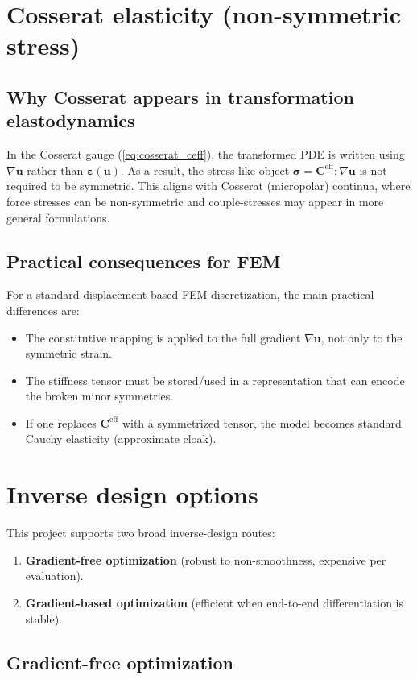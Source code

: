 \documentclass[11pt,a4paper]{report}
\begin{document}
\chapter{Cosserat elasticity (non-symmetric stress)}
\section{Why Cosserat appears in transformation elastodynamics}
In the Cosserat gauge (\cref{eq:cosserat_ceff}), the transformed PDE is written using $\nabla \bm u$ rather than $\bm\varepsilon(\bm u)$.
As a result, the stress-like object $\bm\sigma = \bm C^{\mathrm{eff}} : \nabla \bm u$ is not required to be symmetric.
This aligns with Cosserat (micropolar) continua, where force stresses can be non-symmetric and couple-stresses may appear in more general formulations.

\section{Practical consequences for FEM}
For a standard displacement-based FEM discretization, the main practical differences are:
\begin{itemize}
\item The constitutive mapping is applied to the full gradient $\nabla \bm u$, not only to the symmetric strain.
\item The stiffness tensor must be stored/used in a representation that can encode the broken minor symmetries.
\item If one replaces $\bm C^{\mathrm{eff}}$ with a symmetrized tensor, the model becomes standard Cauchy elasticity (approximate cloak).
\end{itemize}

\chapter{Inverse design options}
This project supports two broad inverse-design routes:
\begin{enumerate}
\item \textbf{Gradient-free optimization} (robust to non-smoothness, expensive per evaluation).
\item \textbf{Gradient-based optimization} (efficient when end-to-end differentiation is stable).
\end{enumerate}

\section{Gradient-free optimization}
\end{document}
